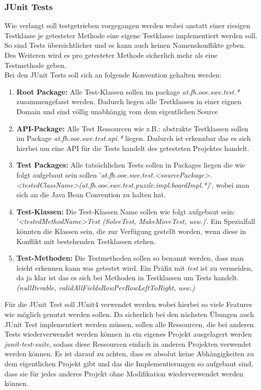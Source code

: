 \documentclass[11pt, a4paper, twoside]{article}   	%
\newcommand{\mainTestPackage}{at.fh.ooe.swe.test}
\begin{document}
\subsubsection{JUnit Tests}
Wie verlangt soll testgetrieben vorgegangen werden wobei anstatt einer riesigen Testklasse je getesteter Methode eine eigene Testklasse implementiert werden soll.\\
So sind Tests übersichtlicher und es kann auch keinen Namenskonflikte geben. Des Weiteren wird es pro getesteter Methode sicherlich mehr als eine Testmethode geben. \\
Bei den JUnit Tests soll sich an folgende Konvention gehalten werden: \\
\begin{enumerate}
	\item \textbf{Root Package:} Alle Test-Klassen sollen im package \emph{\mainTestPackage.*} zusammengefasst werden. Dadurch liegen alle Testklassen in einer eignen Domain und sind völlig unabhängig vom dem eigentlichen Source
	\item \textbf{API-Package:} Alle Test Ressourcen wie z.B.: abstrakte Testklassen sollen im Package \emph{\mainTestPackage.api.*} liegen. Dadurch ist erkennbar das es sich hierbei um eine API für die Tests handelt des getesteten Projektes handelt.
	\item \textbf{Test Packages:} Alle tatsächlichen Tests sollen in Packages liegen die wie folgt aufgebaut sein sollen '\emph{\mainTestPackage.\textless sourcePackage\textgreater .\textless testedClassName\textgreater (\mainTestPackage.puzzle.impl.boardImpl.*)}', wobei man sich an die Java Bean Convention zu halten hat.
	\item \textbf{Test-Klassen:} Die Test-Klassen Name sollen wie folgt aufgebaut sein: '\emph{\textless testedMethodName\textgreater Test (SolveTest, MakeMoveTest, usw.)}'. Ein Spezialfall könnten die Klassen sein, die zur Verfügung gestellt worden, wenn diese in Konflikt mit bestehenden Testklassen stehen.
	\item \textbf{Test-Methoden:} Die Testmethoden sollen so benannt werden, dass man leicht erkennen kann was getestet wird. Ein Präfix mit \emph{test} ist zu vermeiden, da ja klar ist das es sich bei Methoden in Testklassen um Tests handelt. \emph{(nullIterable, validAllFieldsRowPerRowLeftToRight, usw.)}
\end{enumerate}
Für die JUnit Test soll JUnit4 verwendet werden wobei hierbei so viele Features wie möglich genutzt werden sollen. Da sicherlich bei den nächsten Übungen auch JUnit Test implementiert werden müssen, sollen alle Ressourcen, die bei anderen Tests wiederverwendet werden können in ein eigenes Projekt ausgelagert werden \emph{junit-test-suite}, sodass diese Ressourcen einfach in anderen Projekten verwendet werden können. Es ist darauf zu achten, dass es absolut keine Abhängigkeiten zu dem eigentlichen Projekt gibt und das die Implementierungen so aufgebaut sind, dass sie für jedes anderes Projekt ohne Modifikation wiederverwendet werden können. \\\\
\end{document}
